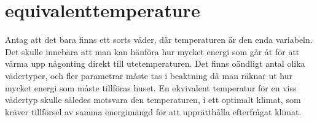 \section{equivalenttemperature}
Antag att det bara finns ett sorts väder, där temperaturen är den enda variabeln. Det skulle innebära att man kan hänföra hur mycket energi som går åt för att värma upp någonting direkt till utetemperaturen. Det finns oändligt antal olika vädertyper, och fler parametrar måste tas i beaktning då man räknar ut hur mycket energi som måste tillföras huset. En ekvivalent temperatur för en viss vädertyp skulle således motsvara den temperaturen, i ett optimalt klimat, som kräver tillförsel av samma energimängd för att upprätthålla efterfrågat klimat.
